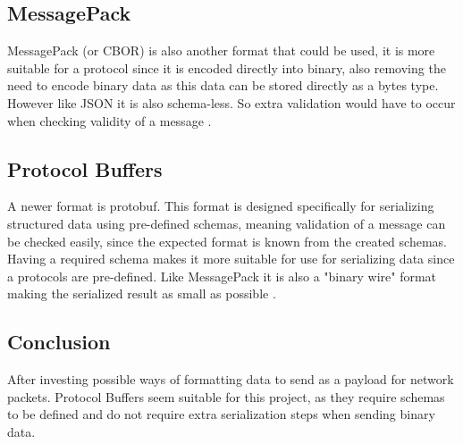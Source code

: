 \subsection*{MessagePack}
MessagePack (or CBOR) is also another format that could be used, it is more suitable for a protocol since it is encoded directly into binary, also removing the need to encode binary data as this data can be stored directly as a bytes type. However like JSON it is also schema-less. So extra validation would have to occur when checking validity of a message \parencite{msgpack} \parencite{cbor-rfc8949}.

\subsection*{Protocol Buffers}
A newer format is protobuf. This format is designed specifically for serializing structured data using pre-defined schemas, meaning validation of a message can be checked easily, since the expected format is known from the created schemas. Having a required schema makes it more suitable for use for serializing data since a protocols are pre-defined. Like MessagePack it is also a "binary wire" format making the serialized result as small as possible \parencite{protobuf-3}.

\subsection*{Conclusion}
After investing possible ways of formatting data to send as a payload for network packets. Protocol Buffers seem suitable for this project, as they require schemas to be defined and do not require extra serialization steps when sending binary data.
